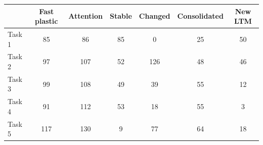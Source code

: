 \begin{tabular}{@{}lcccccc@{}}
\toprule
& \textbf{Fast plastic} & \textbf{Attention} & \textbf{Stable} & \textbf{Changed} & \textbf{Consolidated} & \textbf{New LTM} \\
\midrule
Task 1 & 85 & 86 & 85 & 0 & 25 & 50 \\
Task 2 & 97 & 107 & 52 & 126 & 48 & 46 \\
Task 3 & 99 & 108 & 49 & 39 & 55 & 12 \\
Task 4 & 91 & 112 & 53 & 18 & 55 & 3 \\
Task 5 & 117 & 130 & 9 & 77 & 64 & 18 \\
\bottomrule
\end{tabular}
